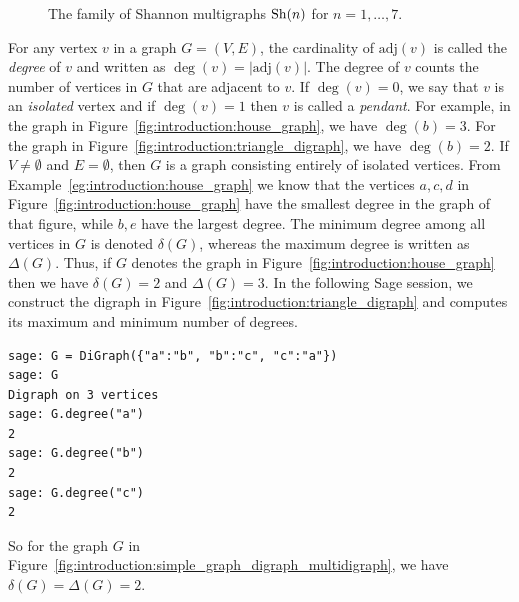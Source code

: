 \begin{figure}[!htbp]
{
}
\quad
\caption{The family of Shannon multigraphs $\operatorname*{Sh}(n)$ for $n = 1,\dots,7$.}
\label{fig:introduction:Shannon_multigraphs}
\end{figure}

For any vertex $v$ in a graph $G = (V, E)$, the cardinality of
$\text{adj}(v)$ is called the \emph{degree} of $v$ and written as
$\deg(v) = |\text{adj}(v)|$\index{$\deg$}. The degree of $v$ counts
the number of vertices in $G$ that are adjacent to $v$. If
$\deg(v) = 0$, we say that $v$ is an
\emph{isolated} vertex and if $\deg(v) = 1$
then $v$ is called a \emph{pendant}. For example, in
the graph in Figure~\ref{fig:introduction:house_graph}, we have
$\deg(b) = 3$. For the graph in
Figure~\ref{fig:introduction:triangle_digraph}, we have
$\deg(b) = 2$. If $V \neq \emptyset$ and $E = \emptyset$, then
$G$ is a graph consisting entirely of isolated vertices. From
Example~\ref{eg:introduction:house_graph} we know that the vertices
$a, c, d$ in Figure~\ref{fig:introduction:house_graph} have the
smallest degree in the graph of that figure, while $b, e$ have the
largest degree. The minimum degree among all vertices in $G$ is
denoted $\delta(G)$, whereas the maximum degree is written as
$\Delta(G)$. Thus, if $G$ denotes the graph in
Figure~\ref{fig:introduction:house_graph} then we have $\delta(G) = 2$
and $\Delta(G) = 3$. In the following Sage session, we construct the
digraph in Figure~\ref{fig:introduction:triangle_digraph} and computes
its maximum and minimum number of degrees.
\index{$\delta$}
\index{$\Delta$}
%
\begin{lstlisting}
sage: G = DiGraph({"a":"b", "b":"c", "c":"a"})
sage: G
Digraph on 3 vertices
sage: G.degree("a")
2
sage: G.degree("b")
2
sage: G.degree("c")
2
\end{lstlisting}
%
So for the graph $G$ in
Figure~\ref{fig:introduction:simple_graph_digraph_multidigraph}, we have
$\delta(G) = \Delta(G) = 2$.

